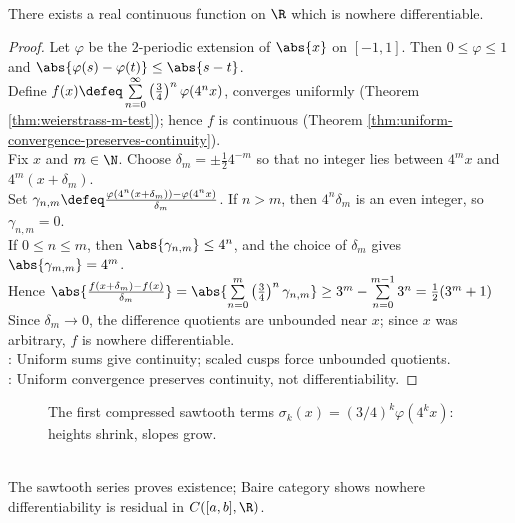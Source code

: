 \begin{theorem} \label{thm:continuous-nowhere-differentiable-example} \\
There exists a real continuous function on $\R$ which is nowhere differentiable.
\begin{proof}
Let $\varphi$ be the $2$-periodic extension of $\abs{x}$ on $[-1,1]$. Then $0\leq\varphi\leq1$ and $\abs{\varphi(s)-\varphi(t)}\leq\abs{s-t}$.\\
Define $f(x)\defeq\sum\limits_{n=0}^{\infty}\left(\frac34\right)^n\varphi(4^n x)$, converges uniformly (Theorem \ref{thm:weierstrass-m-test}); hence $f$ is continuous  (Theorem \ref{thm:uniform-convergence-preserves-continuity}).\\
Fix $x$ and $m\in\N$. Choose $\delta_m=\pm\frac12 4^{-m}$ so that no integer lies between $4^m x$ and $4^m(x+\delta_m)$.\\
Set $\gamma_{n,m}\defeq\frac{\varphi(4^n(x+\delta_m))-\varphi(4^n x)}{\delta_m}$. If $n>m$, then $4^n\delta_m$ is an even integer, so $\gamma_{n,m}=0$.\\
If $0\leq n\leq m$, then $\abs{\gamma_{n,m}}\leq4^n$, and the choice of $\delta_m$ gives $\abs{\gamma_{m,m}}=4^m$.\\
Hence $\abs{\frac{f(x+\delta_m)-f(x)}{\delta_m}} =\abs{\sum\limits_{n=0}^{m}\left(\frac34\right)^n\gamma_{n,m}} \geq 3^m-\sum\limits_{n=0}^{m-1}3^n =\frac12(3^m+1)$\\
Since $\delta_m\to0$, the difference quotients are unbounded near $x$; since $x$ was arbitrary, $f$ is nowhere differentiable.\\
: Uniform sums give continuity; scaled cusps force unbounded quotients.\\
: Uniform convergence preserves continuity, not differentiability.
\end{proof}
\end{theorem}

\begin{figure}[H]
  \centering
  
  \caption{The first compressed sawtooth terms $\sigma_k(x)=(3/4)^k\varphi(4^kx)$: heights shrink, slopes grow.}
  \label{fig:takagi-sawtooth-building-block}
\end{figure}

\begin{perspective} \label{per:nowhere-differentiability-explicit-and-generic} \\
The sawtooth series proves existence; Baire category shows nowhere differentiability is residual in $C([a,b],\R)$.
\end{perspective}

